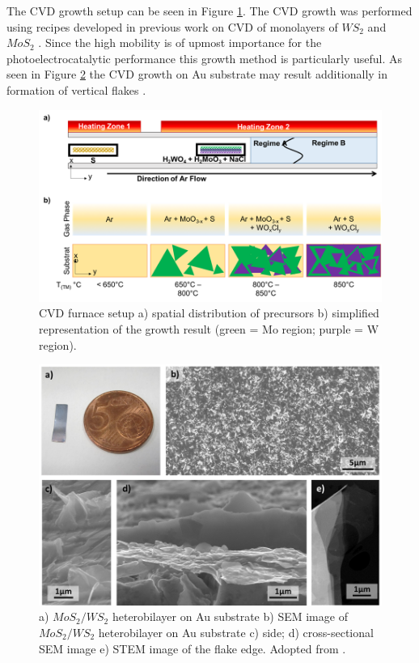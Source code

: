 The CVD growth setup can be seen in Figure \ref{fig:HeterostructureCVDGrowthSetup}. The CVD growth was performed using recipes developed in previous work on CVD of monolayers of $WS_2$ and $MoS_2$ \cite{Reale2017}. Since the high mobility is of upmost importance for the photoelectrocatalytic performance \cite{Li2015a} this growth method is particularly useful. As seen in Figure \ref{fig:HeterostructureSEMImages} the CVD growth on Au substrate may result additionally in formation of vertical flakes \cite{Shi2014}.

\begin{figure}[ht]
	\begin{center}
		\includegraphics[scale=0.4]{Heterostructures/CVDGrowthSetup.png}
		\caption{CVD furnace setup a) spatial distribution of precursors  b) simplified representation of the growth result (green = Mo region;  purple = W region).}
		\label{fig:HeterostructureCVDGrowthSetup}
	\end{center}
\end{figure}

\begin{figure}[H]
	\begin{center}
		\includegraphics[scale=0.4]{Heterostructures/SEMImages.png}
		\caption{a) $MoS_2/WS_2$ heterobilayer on Au substrate b) SEM image of $MoS_2/WS_2$ heterobilayer on Au substrate c) side; d) cross-sectional SEM image e) STEM image of the flake edge. Adopted from \cite{Sherrell2019}.}
		\label{fig:HeterostructureSEMImages}
	\end{center}
\end{figure}

